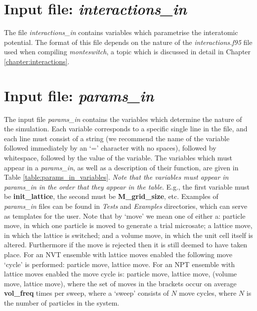 \documentclass{report}
\begin{document}
\section{Input file: \emph{interactions\_in}}
The file \emph{interactions\_in} contains variables which parametrise the interatomic potential. The format of this file depends on
the nature of the \emph{interactions.f95} file used when compiling \emph{monteswitch}, a topic which is discussed in detail in Chapter
\ref{chapter:interactions}.

\section{Input file: \emph{params\_in}}\label{section:params_in}
The input file \emph{params\_in} contains the variables which determine the nature of the simulation. Each variable corresponds to a
specific single line in the file, and each line must consist of a string (we recommend the name of the variable followed immediately
by an `=' character with no spaces), followed by whitespace, followed by the value of the variable. The variables which must appear
in a \emph{params\_in}, as well as a description of their function, are given in Table \ref{table:params_in_variables}. 
\emph{Note that the variables must appear in params\_in in the order that they appear in the table}. E.g., the first 
variable must be \textbf{init\_lattice}, the second must be \textbf{M\_grid\_size}, etc. Examples of \emph{params\_in} files can
be found in \emph{Tests} and \emph{Examples} directories, which can serve as templates for the user.
%
Note that by `move' we mean one of either a: particle move, in which one particle is moved to generate a trial microsate; a lattice move, in 
which the lattice is switched; and a volume move, in which the unit cell itself is altered. Furthermore if the move is rejected then it is 
still deemed to have taken place. For an NVT ensemble with lattice moves enabled the following move `cycle' is performed: particle move, 
lattice move. For an NPT ensemble with lattice moves enabled the move cycle is: particle move, lattice move, (volume move, lattice move), 
where the set of moves in the brackets occur on average \textbf{vol\_freq} times per sweep, where a `sweep' consists of $N$ move cycles,
where $N$ is the number of particles in the system.
\end{document}
